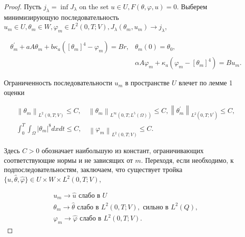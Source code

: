\begin{proof}
    Пусть $j_{\lambda}=\inf J_{\lambda}$ on the set $u \in U, F(\theta, \varphi, u)=0$.
    Выберем минимизирующую последовательность
    $u_{m} \in U, \theta_{m} \in W, \varphi_{m} \in L^{2}(0, T; V),
    J_{\lambda}\left(\theta_{m}, u_{m}\right) \rightarrow j_{\lambda}$,

    \begin{equation}
        \label{eq:2_3:13}
        \begin{aligned}
            \theta_{m}^{\prime}+a A \theta_{m}
            + b \kappa_{a}\left(\left[\theta_{m}\right]^{4}
            - \varphi_{m}\right)=B r, & \theta_{m}(0)=\theta_{0}, \\
            & \alpha A \varphi_{m}+\kappa_{a}\left(\varphi_{m}-
            \left[\theta_{m}\right]^{4}\right)=B u_{m}.
        \end{aligned}
    \end{equation}

    Ограниченность последовательности $u_{m}$
    в пространстве $U$ влечет по лемме 1 оценки

    \[
        \begin{gathered}
            \left\|\theta_{m}\right\|_{L^{2}(0, T ; V)} \leq C,
            \quad\left\|\theta_{m}\right\|_{L^{\infty}\left(0, T; L^{5}(\Omega)\right)} \leq C,
            \left\|\theta_{m}^{\prime}\right\|_{L^{2}\left(0, T; V^{\prime}\right)} \leq C, \\
            \int_{0}^{T} \int_{\Omega}\left|\theta_{m}\right|^{8} d x d t \leq C,
            \quad\left\|\varphi_{m}\right\|_{L^{2}(0, T ; V)} \leq C.
        \end{gathered}
    \]

    Здесь $C>0$ обозначает наибольшую из констант,
    ограничивающих соответствующие нормы и не зависящих от $m$.
    Переходя, если необходимо, к подпоследовательностям, заключаем, что существует тройка
    $\{\widehat{u}, \widehat{\theta}, \widehat{\varphi}\}
    \in U \times W \times L^{2}(0, T; V)$,

    \[
        \begin{gathered}
            u_{m} \rightarrow \widehat{u} \text { слабо в } U \\
            \theta_{m} \rightarrow \widehat{\theta}
            \text{ слабо в } L^{2}(0, T; V), \text { сильно в } L^{2}(Q), \\
            \varphi_{m} \rightarrow \widehat{\varphi}
            \text{ слабо в }  L^{2}(0, T ; V).
        \end{gathered}
    \]



\end{proof}
